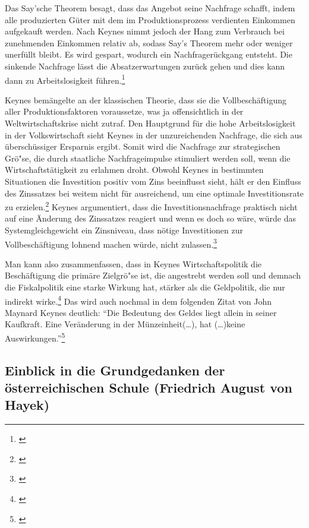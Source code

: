 \documentclass[
        onecolumn,
        a4paper,
        abstracton,
        parskip=half
        ,final
        ]{scrartcl}
\begin{document}
Das Say'sche Theorem besagt, dass das Angebot seine Nachfrage schafft, indem alle produzierten G{\"u}ter mit dem im Produktionsprozess verdienten Einkommen aufgekauft werden. Nach Keynes nimmt jedoch der Hang zum Verbrauch bei zunehmenden Einkommen relativ ab, sodass Say's Theorem mehr oder weniger unerf{\"u}llt bleibt. Es wird gespart, wodurch ein Nachfrager{\"u}ckgang entsteht. Die sinkende Nachfrage l{\"a}sst die Absatzerwartungen zur{\"u}ck gehen und dies kann dann zu Arbeitslosigkeit f{\"u}hren.\footnote[59]{\citep*[S.203]{peters2000}} 

Keynes bem{\"a}ngelte an der klassischen Theorie, dass sie die Vollbesch{\"a}ftigung aller Produktionsfaktoren voraussetze, was ja offensichtlich in der Weltwirtschaftskrise nicht zutraf. Den Hauptgrund f{\"u}r die hohe Arbeitslosigkeit in der Volkswirtschaft sieht Keynes in der unzureichenden Nachfrage, die sich aus {\"u}bersch{\"u}ssiger Ersparnis ergibt. Somit wird die Nachfrage zur strategischen Gr{\"o}{"s}e, die durch staatliche Nachfrageimpulse stimuliert werden soll, wenn die Wirtschaftst{\"a}tigkeit zu erlahmen droht. Obwohl Keynes in bestimmten Situationen die Investition positiv vom Zins beeinflusst sieht, h{\"a}lt er den Einfluss des Zinssatzes bei weitem nicht f{\"u}r ausreichend, um eine optimale Investitionsrate zu erzielen.\footnote[60]{\citep*[S.208]{peters2000}}
Keynes argumentiert, dass die Investitionsnachfrage praktisch nicht auf eine {\"A}nderung des Zinssatzes reagiert und wenn es doch so w{\"a}re, w{\"u}rde das Systemgleichgewicht
ein Zinsniveau, dass n{\"o}tige Investitionen zur Vollbesch{\"a}ftigung lohnend machen w{\"u}rde,
nicht zulassen.\footnote[61]{ \citep*[S.174]{bombach1981theorie}}

Man kann also zusammenfassen, dass in Keynes Wirtschaftspolitik die Besch{\"a}ftigung die prim{\"a}re Zielgr{\"o}{"s}e ist, die angestrebt werden soll und demnach die Fiskalpolitik
eine starke Wirkung hat, st{\"a}rker als die Geldpolitik, die nur indirekt wirke.\footnote[62]{\citep*[S.181]{bombach1981theorie}}
Das wird auch nochmal in dem folgenden Zitat von John Maynard Keynes deutlich: "`Die Bedeutung des Geldes liegt allein in seiner Kaufkraft. Eine Ver{\"a}nderung in der M{\"u}nzeinheit(\ldots), hat (\ldots)keine Auswirkungen."'\footnote[63]{\citep*[S.1]{Keynes1997}}

\subsection{Einblick in die Grundgedanken der {\"o}sterreichischen Schule (Friedrich August von Hayek)} %
\end{document}

